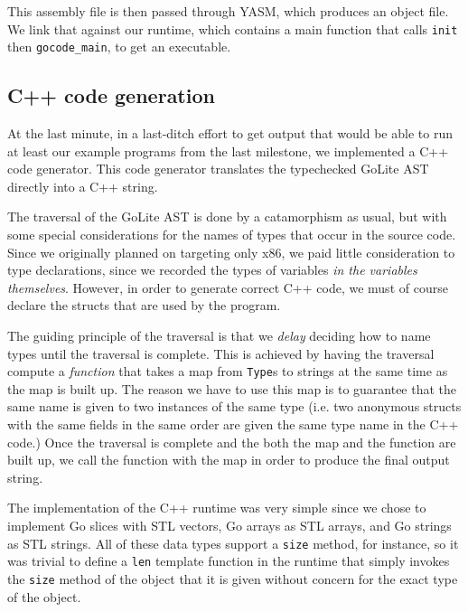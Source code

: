 \documentclass[letterpaper,11pt]{article}
\begin{document}
This assembly file is then passed through YASM, which produces an object file. We link that against our runtime, which contains a main function that calls \texttt{init} then \texttt{gocode\_main}, to get an executable.

\subsection{C++ code generation}

At the last minute, in a last-ditch effort to get output that would be able to run at least our example programs from the last milestone, we implemented a C++ code generator. This code generator translates the typechecked GoLite AST directly into a C++ string.

The traversal of the GoLite AST is done by a catamorphism as usual, but with some special considerations for the names of types that occur in the source code. Since we originally planned on targeting only x86, we paid little consideration to type declarations, since we recorded the types of variables \emph{in the variables themselves}. However, in order to generate correct C++ code, we must of course declare the structs that are used by the program.

The guiding principle of the traversal is that we \emph{delay} deciding how to name types until the traversal is complete. This is achieved by having the traversal compute a \emph{function} that takes a map from \texttt{Type}s to strings at the same time as the map is built up. The reason we have to use this map is to guarantee that the same name is given to two instances of the same type (i.e. two anonymous structs with the same fields in the same order are given the same type name in the C++ code.) Once the traversal is complete and the both the map and the function are built up, we call the function with the map in order to produce the final output string.

The implementation of the C++ runtime was very simple since we chose to implement Go slices with STL vectors, Go arrays as STL arrays, and Go strings as STL strings. All of these data types support a \texttt{size} method, for instance, so it was trivial to define a \texttt{len} template function in the runtime that simply invokes the \texttt{size} method of the object that it is given without concern for the exact type of the object.
\end{document}
